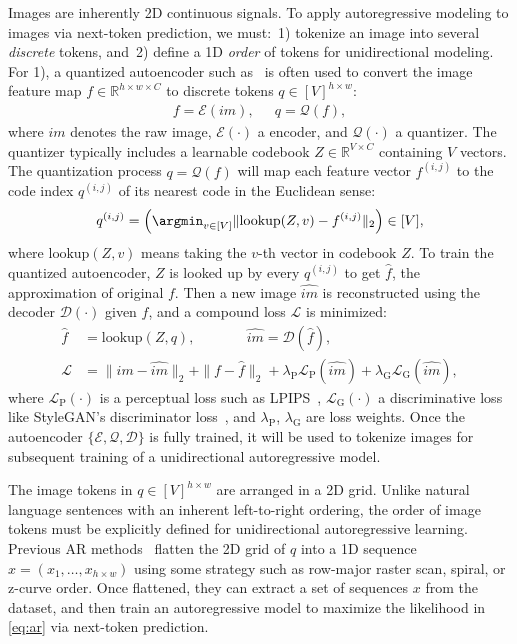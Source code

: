 Images are inherently 2D continuous signals.
To apply autoregressive modeling to images via next-token prediction, we must:\, 1) tokenize an image into several \textit{discrete} tokens, and\, 2) define a 1D \textit{order} of tokens for unidirectional modeling.\, For 1), a quantized autoencoder such as~\cite{vqgan} is often used to convert the image feature map $f \in \mathbb{R}^{h\times w\times C}$ to discrete tokens $q \in [V]^{h\times w}$:
\begin{align}
    f = \mathcal{E}(im), \quad~~
    q = \mathcal{Q}(f),
\end{align}
where $im$ denotes the raw image, $\mathcal{E}(\cdot)$ a encoder, and $\mathcal{Q}(\cdot)$ a quantizer.
The quantizer typically includes a learnable codebook $Z \in \mathbb{R}^{V\times C}$ containing $V$ vectors.
The quantization process $q = \mathcal{Q}(f)$ will map each feature vector $f^{(i,j)}$ to the code index $q^{(i,j)}$ of its nearest code in the Euclidean sense:
\begin{align}
    q^{(i,j)} = \left( \argmin_{v \in [V]} \| \text{lookup}(Z, v) - f^{(i,j)} \|_2 \right) \in [V],
\end{align}
where $\text{lookup}(Z, v)$ means taking the $v$-th vector in codebook $Z$.
To train the quantized autoencoder, $Z$ is looked up by every $q^{(i,j)}$ to get $\hat{f}$, the approximation of original $f$. Then a new image $\hat{im}$ is reconstructed using the decoder $\mathcal{D}(\cdot)$ given $\hat{f}$, and a compound loss $\mathcal{L}$ is minimized:
\begin{align}
    \hat{f} &= \text{lookup}(Z, q), %
    \quad\quad\quad~~~ \hat{im} = \mathcal{D}(\hat{f}), \\
    \mathcal{L} &= \|im - \hat{im}\|_2 + \|f - \hat{f}\|_2 + \lambda_{\text{P}} \mathcal{L}_{\text{P}}(\hat{im}) + \lambda_{\text{G}} \mathcal{L}_{\text{G}}(\hat{im}), \label{eq:vaeloss}
\end{align}
where $\mathcal{L}_{\text{P}}(\cdot)$ is a perceptual loss such as LPIPS~\cite{lpips}, $\mathcal{L}_{\text{G}}(\cdot)$ a discriminative loss like StyleGAN's discriminator loss~\cite{stylegan}, and $\lambda_{\text{P}}$, $\lambda_{\text{G}}$ are loss weights.
Once the autoencoder $\{\mathcal{E}, \mathcal{Q}, \mathcal{D}\}$ is fully trained, it will be used to tokenize images for subsequent training of a unidirectional autoregressive model. 

\vspace{2pt}
The image tokens in $q \in [V]^{h\times w}$ are arranged in a 2D grid.
Unlike natural language sentences with an inherent left-to-right ordering, the order of image tokens must be explicitly defined for unidirectional autoregressive learning.
Previous AR methods~\cite{vqgan,vit-vqgan,rq} flatten the 2D grid of $q$ into a 1D sequence $x = (x_1, \dots, x_{h\times w})$ using some strategy such as row-major raster scan, spiral, or z-curve order.
Once flattened, they can extract a set of sequences $x$ from the dataset, and then train an autoregressive model to maximize the likelihood in \eqref{eq:ar} via next-token prediction.

